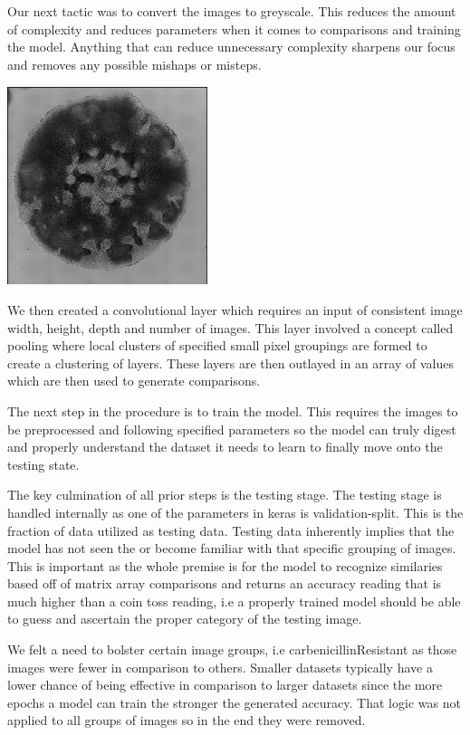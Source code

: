 \documentclass[conference]{IEEEtran}
\begin{document}
Our next tactic was to convert the images to greyscale. This reduces the amount of complexity and reduces parameters when it comes to comparisons and training the model. Anything that can reduce unnecessary complexity sharpens our focus and removes any possible mishaps or misteps. 


\includegraphics{gray.jpg} 


We then created a convolutional layer which requires an input of consistent image width, height, depth and number of images. This layer involved a concept called pooling where local clusters of specified small pixel groupings are formed to create a clustering of layers. These layers are then outlayed in an array of values which are then used to generate comparisons. 

The next step in the procedure is to train the model. This requires the images to be preprocessed and following specified parameters so the model can truly digest and properly understand the dataset it needs to learn to finally move onto the testing state.

The key culmination of all prior steps is the testing stage. The testing stage is handled internally as one of the parameters in keras is validation-split. This is the fraction of data utilized as testing data. Testing data inherently implies that the model has not seen the or become familiar with that specific grouping of images. This is important as the whole premise is for the model to recognize similaries based off of matrix array comparisons and returns an accuracy reading that is much higher than a coin toss reading, i.e a properly trained model should be able to guess and ascertain the proper category of the testing image.

We felt a need to bolster certain image groups, i.e carbenicillinResistant as those images were fewer in comparison to others. Smaller datasets typically have a lower chance of being effective in comparison to larger datasets since the more epochs a model can train the stronger the generated accuracy. That logic was not applied to all groups of images so in the end they were removed. 
\end{document}
